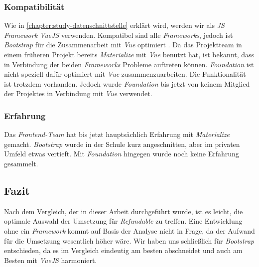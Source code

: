 \subsubsection{Kompatibilität}
\label{chapter:study-frontend-vergleich-kompatibilität}
Wie in \autoref{chapter:study-datenschnittstelle} erklärt wird, werden wir als \textit{JS Framework} \textit{VueJS} verwenden. Kompatibel sind alle \textit{Frameworks}, jedoch ist \textit{Bootstrap} für die Zusammenarbeit mit \textit{Vue} optimiert \cite{bootstrap-docu}. Da das Projektteam in einem früheren Projekt bereits \textit{Materialize} mit \textit{Vue} benutzt hat, ist bekannt, dass in Verbindung der beiden \textit{Frameworks} Probleme auftreten können. \textit{Foundation} ist nicht speziell dafür optimiert mit \textit{Vue} zusammenzuarbeiten. Die Funktionalität ist trotzdem vorhanden. Jedoch wurde \textit{Foundation} bis jetzt von keinem Mitglied der Projektes in Verbindung mit \textit{Vue} verwendet.

\subsubsection{Erfahrung}
\label{chapter:study-frontend-vergleich-erfahrung}
Das\textit{ Frontend-Team} hat bis jetzt hauptsächlich Erfahrung mit \textit{Materialize} gemacht. \textit{Bootstrap} wurde in der Schule kurz angeschnitten, aber im privaten Umfeld etwas vertieft. Mit \textit{Foundation} hingegen wurde noch keine Erfahrung gesammelt.

\subsection{Fazit}
\label{chapter:study-frontend-vergleich-fazit}
Nach dem Vergleich, der in dieser Arbeit durchgeführt wurde, ist es leicht, die optimale Auswahl der Umsetzung für \textit{Refundable} zu treffen. Eine Entwicklung ohne ein \textit{Framework} kommt auf Basis der Analyse nicht in Frage, da der Aufwand für die Umsetzung wesentlich höher wäre. Wir haben uns schließlich für \textit{Bootstrap} entschieden, da es im Vergleich eindeutig am besten abschneidet und auch am Besten mit \textit{VueJS} harmoniert.

